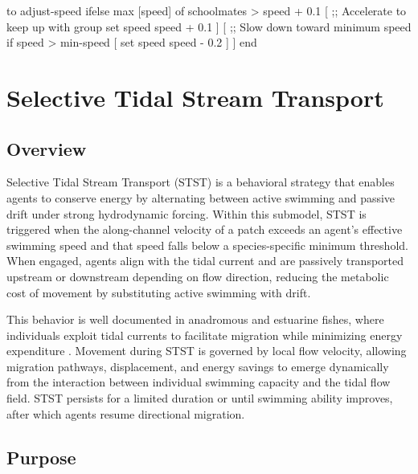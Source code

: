 \documentclass[
]{book}
\newenvironment{Shaded}{\begin{snugshade}}{\end{snugshade}}
\newcommand{\NormalTok}[1]{#1}
\begin{document}
\begin{Shaded}
\begin{Highlighting}[]
\NormalTok{to adjust{-}speed}
\NormalTok{  ifelse max [speed] of schoolmates \textgreater{} speed + 0.1}
\NormalTok{  [}
\NormalTok{    ;; Accelerate to keep up with group}
\NormalTok{    set speed speed + 0.1}
\NormalTok{  ]}
\NormalTok{  [}
\NormalTok{    ;; Slow down toward minimum speed}
\NormalTok{    if speed \textgreater{} min{-}speed [}
\NormalTok{      set speed speed {-} 0.2}
\NormalTok{    ]}
\NormalTok{  ]}
\NormalTok{end}
\end{Highlighting}
\end{Shaded}

\chapter{Selective Tidal Stream Transport}\label{selective-tidal-stream-transport}

\section{Overview}\label{overview-10}

Selective Tidal Stream Transport (STST) is a behavioral strategy that enables agents to conserve energy by alternating between active swimming and passive drift under strong hydrodynamic forcing. Within this submodel, STST is triggered when the along-channel velocity of a patch exceeds an agent's effective swimming speed and that speed falls below a species-specific minimum threshold. When engaged, agents align with the tidal current and are passively transported upstream or downstream depending on flow direction, reducing the metabolic cost of movement by substituting active swimming with drift.

This behavior is well documented in anadromous and estuarine fishes, where individuals exploit tidal currents to facilitate migration while minimizing energy expenditure \citep{ForwardTankersley2001, Gibson2001STST}. Movement during STST is governed by local flow velocity, allowing migration pathways, displacement, and energy savings to emerge dynamically from the interaction between individual swimming capacity and the tidal flow field. STST persists for a limited duration or until swimming ability improves, after which agents resume directional migration.

\section{Purpose}\label{purpose-9}
\end{document}
